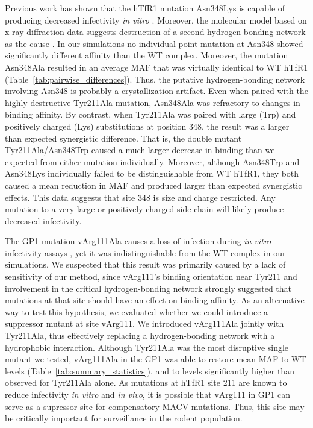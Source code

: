 \documentclass[12pt]{article}
\begin{document}
Previous work has shown that the hTfR1 mutation Asn348Lys is capable of producing decreased infectivity \emph{in vitro} \citep{Rad2008,Rad20111}. Moreover, the molecular model based on x-ray diffraction data suggests destruction of a second hydrogen-bonding network as the cause \citep{Abraham2010}. In our simulations no individual point mutation at Asn348 showed significantly different affinity than the WT complex. Moreover, the mutation Asn348Ala resulted in an average MAF that was virtually identical to WT hTfR1 (Table~\ref{tab:pairwise_differences}). Thus, the putative hydrogen-bonding network involving Asn348 is probably a crystallization artifact. Even when paired with the highly destructive Tyr211Ala mutation, Asn348Ala was refractory to changes in binding affinity. By contrast, when Tyr211Ala was paired with large (Trp) and positively charged (Lys) substitutions at position 348, the result was a larger than expected synergistic difference. That is, the double mutant Tyr211Ala/Asn348Trp caused a much larger decrease in binding than we expected from either mutation individually. Moreover, although Asn348Trp and Asn348Lys individually failed to be distinguishable from WT hTfR1, they both caused a mean reduction in MAF and produced larger than expected synergistic effects. This data suggests that site 348 is size and charge restricted. Any mutation to a very large or positively charged side chain will likely produce decreased infectivity.

The GP1 mutation vArg111Ala causes a loss-of-infection during \textit{in vitro} infectivity assays \citep{Rad20112}, yet it was indistinguishable from the WT complex in our simulations. We suspected that this result was primarily caused by a lack of sensitivity of our method, since vArg111's binding orientation near Tyr211 and involvement in the critical hydrogen-bonding network strongly suggested that mutations at that site should have an effect on binding affinity. As an alternative way to test this hypothesis, we evaluated whether we could introduce a suppressor mutant at site vArg111. We introduced vArg111Ala jointly with Tyr211Ala, thus effectively replacing a hydrogen-bonding network with a hydrophobic interaction. Although Tyr211Ala was the most disruptive single mutant we tested, vArg111Ala in the GP1 was able to restore mean MAF to WT levels (Table~\ref{tab:summary_statistics}), and to levels significantly higher than observed for Tyr211Ala alone. As mutations at hTfR1 site 211 are known to reduce infectivity \emph{in vitro} and \emph{in vivo}, it is possible that vArg111 in GP1 can serve as a supressor site for compensatory MACV mutations. Thus, this site may be critically important for surveillance in the rodent population.
\end{document}
